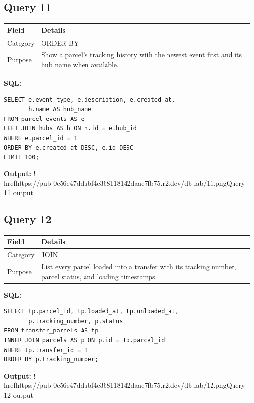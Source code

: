 \documentclass[11pt,a4paper]{article}
\begin{document}
\subsection{Query 11}
\begin{tabularx}{\linewidth}{>{\raggedright\arraybackslash}X|>{\raggedright\arraybackslash}X}
\hline
\textbf{Field} & \textbf{Details} \\ 
\hline
Category & ORDER BY \\ 
\hline
Purpose & Show a parcel's tracking history with the newest event first and its hub name when available. \\ 
\hline
\end{tabularx}
\textbf{SQL:}
\begin{lstlisting}
SELECT e.event_type, e.description, e.created_at,
       h.name AS hub_name
FROM parcel_events AS e
LEFT JOIN hubs AS h ON h.id = e.hub_id
WHERE e.parcel_id = 1
ORDER BY e.created_at DESC, e.id DESC
LIMIT 100;
\end{lstlisting}
\textbf{Output:}
!\\href{https://pub-0c56e47ddabf4c368118142daae7fb75.r2.dev/db-lab/11.png}{Query 11 output}
\subsection{Query 12}
\begin{tabularx}{\linewidth}{>{\raggedright\arraybackslash}X|>{\raggedright\arraybackslash}X}
\hline
\textbf{Field} & \textbf{Details} \\ 
\hline
Category & JOIN \\ 
\hline
Purpose & List every parcel loaded into a transfer with its tracking number, parcel status, and loading timestamps. \\ 
\hline
\end{tabularx}
\textbf{SQL:}
\begin{lstlisting}
SELECT tp.parcel_id, tp.loaded_at, tp.unloaded_at,
       p.tracking_number, p.status
FROM transfer_parcels AS tp
INNER JOIN parcels AS p ON p.id = tp.parcel_id
WHERE tp.transfer_id = 1
ORDER BY p.tracking_number;
\end{lstlisting}
\textbf{Output:}
!\\href{https://pub-0c56e47ddabf4c368118142daae7fb75.r2.dev/db-lab/12.png}{Query 12 output}
\end{document}
